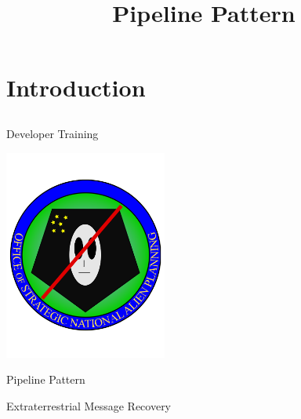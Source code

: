 \documentclass[xcolor=dvipsnames]{beamer}
\begin{document}
	\title[Pipeline Pattern]{Pipeline Pattern}
	\author[]{\className}
	\institute[\className]{\departmentName}
	\date{} 


	\begin{frame}
		\maketitle
	\end{frame}
	
	\section{Introduction} 
		\subsection{} 
			\begin{frame}{Developer Training}
				\begin{center}
					\vspace{-.5in} \includegraphics[width=0.4\textwidth]{images/OSNAP_logo} 
					
					Pipeline Pattern
					
					Extraterrestrial Message Recovery
				\end{center}
			\end{frame}
			
\end{document}
